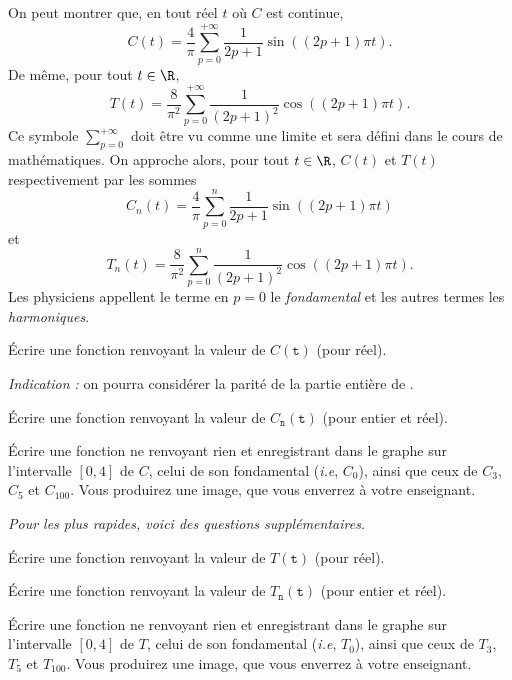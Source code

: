 On peut montrer que, en tout réel $t$ où $C$ est continue, 
\begin{equation*}
  C(t) = \dfrac{4}{\pi}\sum_{p=0}^{+\infty} \dfrac{1}{2p+1} \sin((2p+1)\pi t).
\end{equation*}
De même, pour tout $t\in\R$, 
\begin{equation*}
  T(t) = \dfrac{8}{\pi^2}\sum_{p=0}^{+\infty} \dfrac{1}{(2p+1)^2} \cos((2p+1)\pi t).
\end{equation*}
Ce symbole $\displaystyle \sum_{p=0}^{+\infty}$ doit être vu comme une limite et sera défini dans le cours de mathématiques. 
On approche alors, pour tout $t\in\R$, $C(t)$ et $T(t)$ respectivement par les sommes 
\begin{equation*}
  C_n(t) = \dfrac{4}{\pi}\sum_{p=0}^{n} \dfrac{1}{2p+1} \sin((2p+1)\pi t)
\end{equation*}
et 
\begin{equation*}
   T_n(t) = \dfrac{8}{\pi^2}\sum_{p=0}^{n} \dfrac{1}{(2p+1)^2} \cos((2p+1)\pi t).
\end{equation*}
Les physiciens appellent le terme en $p=0$ le \emph{fondamental} et les autres termes les \emph{harmoniques}. 


\medskip{}

\question{} \'Ecrire une fonction  renvoyant la valeur de $C(\texttt{t})$ (pour  réel). 

\emph{Indication :} on pourra considérer la parité de la partie entière de .


\medskip{}

\question{} \'Ecrire une fonction  renvoyant la valeur de $C_{\texttt{n}}(\texttt{t})$ (pour  entier et  réel). 


\medskip{}

\question{}\label{tp05:qu:creneau} \'Ecrire une fonction  ne renvoyant rien 
et enregistrant dans  le graphe sur l'intervalle $[0,4]$ de $C$, celui 
de son fondamental (\emph{i.e}, $C_0$), ainsi que ceux de $C_3$, $C_5$ et $C_{100}$.
Vous produirez une image, que vous enverrez à votre enseignant. 

\bigskip

\emph{Pour les plus rapides, voici des questions supplémentaires.}

\bigskip



\question{} \'Ecrire une fonction  renvoyant la valeur de $T(\texttt{t})$ (pour 
 réel).


\medskip{}

\question{} \'Ecrire une fonction  renvoyant la valeur de $T_{\texttt{n}}(\texttt{t})$ (pour  entier et  réel). 


\medskip{}

\question{}\label{tp05:qu:triangle} \'Ecrire une fonction  ne renvoyant rien et enregistrant dans  le graphe sur l'intervalle $[0,4]$ de $T$, celui de son fondamental (\emph{i.e}, $T_0$), ainsi que ceux de $T_3$, $T_5$ et $T_{100}$.
Vous produirez une image, que vous enverrez à votre enseignant. 